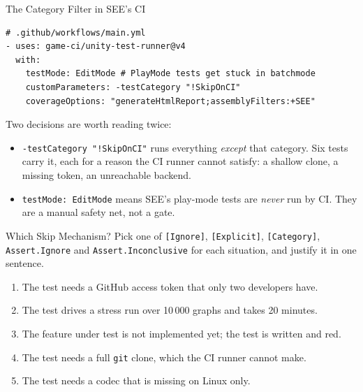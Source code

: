 \begin{frame}[fragile]{The Category Filter in SEE's CI}
  \begin{lstlisting}[language={},basicstyle=\scriptsize\ttfamily]
# .github/workflows/main.yml
- uses: game-ci/unity-test-runner@v4
  with:
    testMode: EditMode # PlayMode tests get stuck in batchmode
    customParameters: -testCategory "!SkipOnCI"
    coverageOptions: "generateHtmlReport;assemblyFilters:+SEE"
  \end{lstlisting}
  \vspace{1ex}

  Two decisions are worth reading twice:
  \begin{itemize}
    \item \texttt{-testCategory "!SkipOnCI"} runs everything \emph{except} that
      category. Six tests carry it, each for a reason the CI runner cannot
      satisfy: a shallow clone, a missing token, an unreachable backend.
    \item \texttt{testMode: EditMode} means SEE's play-mode tests are
      \emph{never} run by CI. They are a manual safety net, not a gate.
    \end{itemize}
  \vspace{2ex}

\end{frame}

\begin{exerciseframe}{Which Skip Mechanism?}
  Pick one of \texttt{[Ignore]}, \texttt{[Explicit]}, \texttt{[Category]},
  \texttt{Assert.Ignore} and \texttt{Assert.Inconclusive} for each situation,
  and justify it in one sentence.
  \vspace{1ex}

  \begin{enumerate}
    \item The test needs a GitHub access token that only two developers have.
    \item The test drives a stress run over 10\,000 graphs and takes 20 minutes.
    \item The feature under test is not implemented yet; the test is written and
      red.
    \item The test needs a full \texttt{git} clone, which the CI runner cannot
      make.
    \item The test needs a codec that is missing on Linux only.
  \end{enumerate}
\end{exerciseframe}

